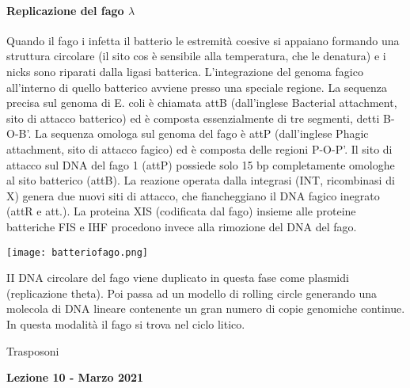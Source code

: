\documentclass{article}
\begin{document}
\paragraph{Replicazione del fago $\lambda$}Quando il fago i infetta il batterio le estremità coesive si appaiano formando una struttura circolare (il sito cos è sensibile alla temperatura, che le
denatura) e i nicks sono riparati dalla ligasi batterica.
L'integrazione del genoma fagico all'interno di quello batterico avviene presso una speciale regione. La sequenza precisa sul genoma di E. coli è
chiamata attB (dall'inglese Bacterial attachment, sito di attacco batterico) ed è composta essenzialmente di tre segmenti, detti B-O-B'. La
sequenza omologa sul genoma del fago è attP (dall'inglese Phagic attachment, sito di attacco fagico) ed è composta delle regioni P-O-P'.
Il sito di attacco sul DNA del fago 1 (attP) possiede solo 15 bp completamente omologhe al sito batterico (attB). La reazione operata dalla
integrasi (INT, ricombinasi di X) genera due nuovi siti di attacco, che fiancheggiano il DNA fagico inegrato (attR e att.).
La proteina XIS (codificata dal fago) insieme alle proteine batteriche FIS e IHF procedono invece alla rimozione del DNA del fago.\\
\begin{center}
    \texttt{[image: batteriofago.png]}
\end{center}
II DNA circolare del fago viene duplicato in questa fase come plasmidi (replicazione theta). Poi passa ad un modello di rolling circle generando una molecola di DNA lineare contenente un gran
numero di copie genomiche continue. In questa modalità il fago si trova nel ciclo litico.


\begin{titlepage}
    \begin{center}
        \vspace*{1cm}
        \LARGE
        Trasposoni
            
        \vspace{1.5cm}
        
        \Large
        \textbf{Lezione 10 - Marzo 2021}

        \vspace{0.8cm}

    \end{center}
\end{titlepage}
\setcounter{page}{39}
\end{document}
